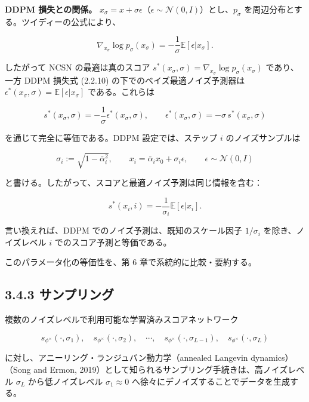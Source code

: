 \textbf{DDPM 損失との関係。} $x_\sigma=x+\sigma\epsilon$（$\epsilon\sim\mathcal{N}(0,I)$）とし、$p_\sigma$ を周辺分布とする。ツイディーの公式により、

\[
\nabla_{x_\sigma}\log p_\sigma(x_\sigma)=-\frac{1}{\sigma}\mathbb{E}[\epsilon|x_\sigma].
\]


したがって NCSN の最適は真のスコア $s^*(x_\sigma,\sigma)=\nabla_{x_\sigma}\log p_\sigma(x_\sigma)$ であり、一方 DDPM 損失式 (2.2.10) の下でのベイズ最適ノイズ予測器は $\epsilon^*(x_\sigma,\sigma)=\mathbb{E}[\epsilon|x_\sigma]$ である。これらは

\[
s^*(x_\sigma,\sigma)=-\frac{1}{\sigma}\epsilon^*(x_\sigma,\sigma),
\qquad
\epsilon^*(x_\sigma,\sigma)=-\sigma\,s^*(x_\sigma,\sigma)
\]


を通じて完全に等価である。DDPM 設定では、ステップ $i$ のノイズサンプルは

\[
\sigma_i:=\sqrt{1-\bar\alpha_i^2},
\qquad
x_i=\bar\alpha_i x_0+\sigma_i\epsilon,
\qquad\epsilon\sim\mathcal{N}(0,I)
\]


と書ける。したがって、スコアと最適ノイズ予測は同じ情報を含む：

\[
s^*(x_i,i)=-\frac{1}{\sigma_i}\mathbb{E}[\epsilon|x_i].
\]


言い換えれば、DDPM でのノイズ予測は、既知のスケール因子 $1/\sigma_i$ を除き、ノイズレベル $i$ でのスコア予測と等価である。

このパラメータ化の等価性を、第 6 章で系統的に比較・要約する。

\subsection*{3.4.3 サンプリング}


複数のノイズレベルで利用可能な学習済みスコアネットワーク

\[
s_{\phi^\times}(\cdot,\sigma_1),\quad
s_{\phi^\times}(\cdot,\sigma_2),\quad
\cdots,\quad
s_{\phi^\times}(\cdot,\sigma_{L-1}),\quad
s_{\phi^\times}(\cdot,\sigma_L)
\]


に対し、アニーリング・ランジュバン動力学（annealed Langevin dynamics）（Song and Ermon, 2019）として知られるサンプリング手続きは、高ノイズレベル $\sigma_L$ から低ノイズレベル $\sigma_1\approx 0$ へ徐々にデノイズすることでデータを生成する。

